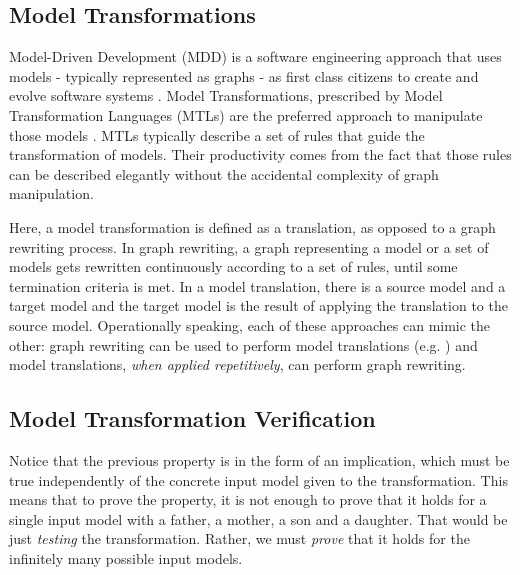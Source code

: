 \subsection{Model Transformations}

Model-Driven Development (MDD) is a software engineering approach that uses
models - typically represented as graphs - as first class citizens to create and evolve software systems
\cite{Hailpern:2006vd}.
Model Transformations, prescribed by Model Transformation Languages (MTLs) are the preferred approach to manipulate those models \cite{Software2003}.
MTLs typically describe a set of rules that guide the transformation of models.
Their productivity comes from the fact that those rules can be described
elegantly without the accidental complexity of graph manipulation.

Here, a model transformation is defined as
a translation, as opposed to a graph rewriting process.
In graph rewriting, a graph representing a model or a set of models gets rewritten continuously according to a set
of rules, until some termination criteria is met.
In a model translation, there is a source model and a target model and the
target model is the result of applying the translation to the source model.
Operationally speaking, each of these approaches can mimic the other: graph
rewriting can be used to perform model translations (e.g. \cite{Grunske2005})
and model translations, \emph{when applied repetitively}, can perform graph
rewriting.


\subsection{Model Transformation Verification}

Notice that the previous property is in the form of an implication, which must
be true independently of the concrete input model given to the transformation.
This means that to prove the property, it is not enough to prove that it holds
for a single input model with a father, a mother, a son and a daughter. That
would be just \emph{testing} the transformation.
Rather, we must \emph{prove} that it holds for the infinitely many possible input models.

